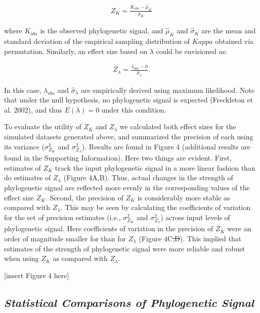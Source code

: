 \documentclass[
]{article}
\begin{document}
\begin{align}
    Z_{K}=\frac{K_{obs}-\hat\mu_K}{\hat\sigma_K}
\end{align}

where \(K_{obs}\) is the observed phylogenetic signal, and \(\hat\mu_K\)
and \(\hat\sigma_K\) are the mean and standard deviation of the
empirical sampling distribution of \(Kappa\) obtained via permutation.
Similarly, an effect size based on \(\lambda\) could be envisioned as:

\begin{align}
    Z_{\lambda}=\frac{\lambda_{obs}-0}{\hat\sigma_\lambda}.
\end{align}

In this case, \(\lambda_{obs}\) and \(\hat\sigma_\lambda\) are
empirically derived using maximum likelihood. Note that under the null
hypothesis, no phylogenetic signal is expected (Freckleton et al. 2002),
and thus \(E(\lambda)=0\) under this condition. \hfill\break

To evaluate the utility of \(Z_K\) and \(Z_\lambda\) we calculated both
effect sizes for the simulated datasets generated above, and summarized
the precision of each using its variance (\(\sigma^2_{Z_K}\) and
\(\sigma^2_{Z_\lambda}\)). Results are found in Figure 4 (additional
results are found in the Supporting Information). Here two things are
evident. First, estimates of \(Z_K\) track the input phylogenetic signal
in a more linear fashion than do estimates of \(Z_\lambda\) (Figure
4A,B). Thus, actual changes in the strength of phylogenetic signal are
reflected more evenly in the corresponding values of the effect size
\(Z_K\). Second, the precision of \(Z_K\) is considerably more stable as
compared with \(Z_\lambda\). This may be seen by calculating the
coefficients of variation for the set of precision estimates (i.e.,
\(\sigma^2_{Z_K}\) and \(\sigma^2_{Z_\lambda}\)) across input levels of
phylogenetic signal. Here coefficients of variation in the precision of
\(Z_K\) were an order of magnitude smaller for than for \(Z_\lambda\)
(Figure 4C\sout{,D}). This implied that estimates of the strength of
phylogenetic signal were more reliable and robust when using \(Z_K\) as
compared with \(Z_\lambda\). \hfill\break

{[}insert Figure 4 here{]}

\hypertarget{statistical-comparisons-of-phylogenetic-signal}{%
\subsection{\texorpdfstring{\emph{Statistical Comparisons of
Phylogenetic
Signal}}{Statistical Comparisons of Phylogenetic Signal}}\label{statistical-comparisons-of-phylogenetic-signal}}
\end{document}
